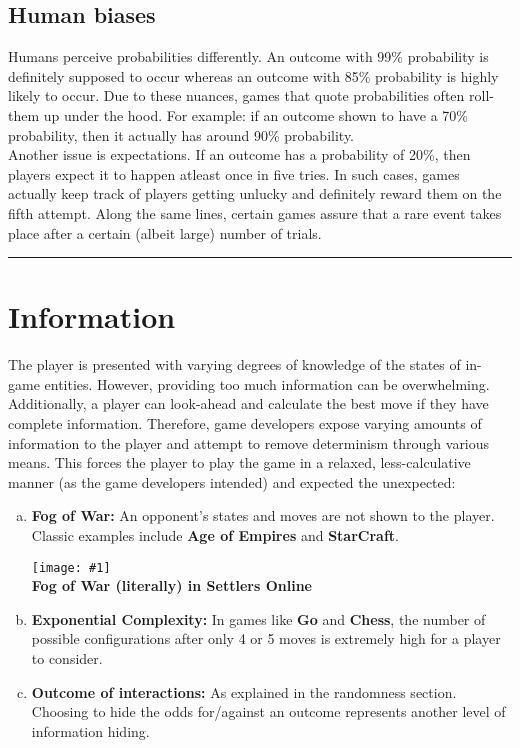 \documentclass[12pt]{article}
\newcommand{\point}[1]{\item \textbf{#1:}}
\newcommand{\drawline}{\vspace{2mm}\hrule}
\newcommand{\fig}[3]{\begin{center} \texttt{[image: \#1]}\\ \textbf{#3} \end{center}}
\begin{document}
\subsection{Human biases}

Humans perceive probabilities differently. An outcome with 99\% probability is definitely supposed to occur whereas an outcome with 85\% probability is highly likely to occur. Due to these nuances, games that quote probabilities often roll-them up under the hood. For example: if an outcome shown to have a 70\% probability, then it actually has around 90\% probability.\\

Another issue is expectations. If an outcome has a probability of 20\%, then players expect it to happen atleast once in five tries. In such cases, games actually keep track of players getting unlucky and definitely reward them on the fifth attempt. Along the same lines, certain games assure that a rare event takes place after a certain (albeit large) number of trials.

\drawline

\section{Information}

The player is presented with varying degrees of knowledge of the states of in-game entities. However, providing too much information can be overwhelming. Additionally, a player can look-ahead and calculate the best move if they have complete information. Therefore, game developers expose varying amounts of information to the player and attempt to remove determinism through various means. This forces the player to play the game in a relaxed, less-calculative manner (as the game developers intended) and expected the unexpected:

\begin{enumerate}[a)]

\point{Fog of War} An opponent's states and moves are not shown to the player. Classic examples include \textbf{Age of Empires} and \textbf{StarCraft}.

\fig{settlers_online.jpg}{0.2}{Fog of War (literally) in Settlers Online}

\point{Exponential Complexity} In games like \textbf{Go} and \textbf{Chess}, the number of possible configurations after only 4 or 5 moves is extremely high for a player to consider.

\point{Outcome of interactions} As explained in the randomness section. Choosing to hide the odds for/against an outcome represents another level of information hiding.

\end{enumerate}
\end{document}
